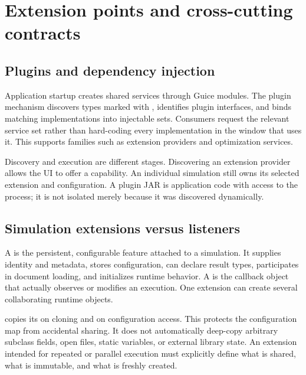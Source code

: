 \chapter{Extension points and cross-cutting contracts}\label{ch:extensions}
\section{Plugins and dependency injection}
Application startup creates shared services through Guice modules. The plugin mechanism discovers types marked with , identifies plugin interfaces, and binds matching implementations into injectable sets. Consumers request the relevant service set rather than hard-coding every implementation in the window that uses it. This supports families such as extension providers and optimization services.

Discovery and execution are different stages. Discovering an extension provider allows the UI to offer a capability. An individual simulation still owns its selected extension and configuration. A plugin JAR is application code with access to the process; it is not isolated merely because it was discovered dynamically.


\section{Simulation extensions versus listeners}
A  is the persistent, configurable feature attached to a simulation. It supplies identity and metadata, stores configuration, can declare result types, participates in document loading, and initializes runtime behavior. A  is the callback object that actually observes or modifies an execution. One extension can create several collaborating runtime objects.

 copies its  on cloning and on configuration access. This protects the configuration map from accidental sharing. It does not automatically deep-copy arbitrary subclass fields, open files, static variables, or external library state. An extension intended for repeated or parallel execution must explicitly define what is shared, what is immutable, and what is freshly created.

